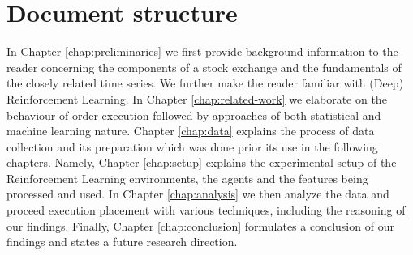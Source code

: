 \section{Document structure}

In Chapter \ref{chap:preliminaries} we first provide background information to the reader concerning the components of a stock exchange and the fundamentals of the closely related time series.
We further make the reader familiar with (Deep) Reinforcement Learning.
In Chapter \ref{chap:related-work} we elaborate on the behaviour of order execution followed by approaches of both statistical and machine learning nature.
Chapter \ref{chap:data} explains the process of data collection and its preparation which was done prior its use in the following chapters.
Namely, Chapter \ref{chap:setup} explains the experimental setup of the Reinforcement Learning environments, the agents and the features being processed and used.
In Chapter \ref{chap:analysis} we then analyze the data and proceed execution placement with various techniques, including the reasoning of our findings.
Finally, Chapter \ref{chap:conclusion} formulates a conclusion of our findings and states a future research direction.
